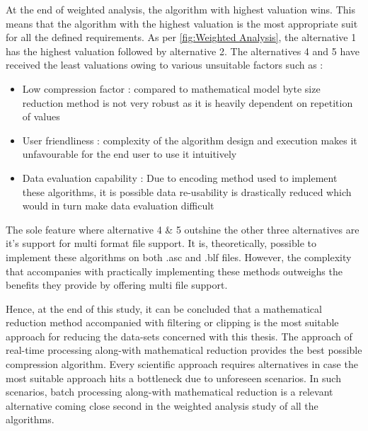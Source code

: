 At the end of weighted analysis, the algorithm with highest valuation wins. This means that the algorithm with the highest valuation is the most appropriate suit for all the defined requirements. As per \ref{fig:Weighted Analysis}, the alternative 1 has the highest valuation followed by alternative 2. The alternatives 4 and 5 have received the least valuations owing to various unsuitable factors such as :

\begin{itemize}
    \item Low compression factor : compared to mathematical model byte size reduction method is not very robust as it is heavily dependent on repetition of values
    \item User friendliness : complexity of the algorithm design and execution makes it unfavourable for the end user to use it intuitively
    \item Data evaluation capability : Due to encoding method used to implement these algorithms, it is possible data re-usability is drastically reduced which would in turn make data evaluation difficult
\end{itemize}

The sole feature where alternative 4 \& 5 outshine the other three alternatives are it's support for multi format file support. It is, theoretically, possible to implement these algorithms on both .asc and .blf files. However, the complexity that accompanies with practically implementing these methods outweighs the benefits they provide by offering multi file support. 


Hence, at the end of this study, it can be concluded that a mathematical reduction method accompanied with filtering or clipping is the most suitable approach for reducing the data-sets concerned with this thesis. The approach of real-time processing along-with mathematical reduction provides the best possible compression algorithm. Every scientific approach requires alternatives in case the most suitable approach hits a bottleneck due to unforeseen scenarios. In such scenarios, batch processing along-with mathematical reduction is a relevant alternative coming close second in the weighted analysis study of all the algorithms. 